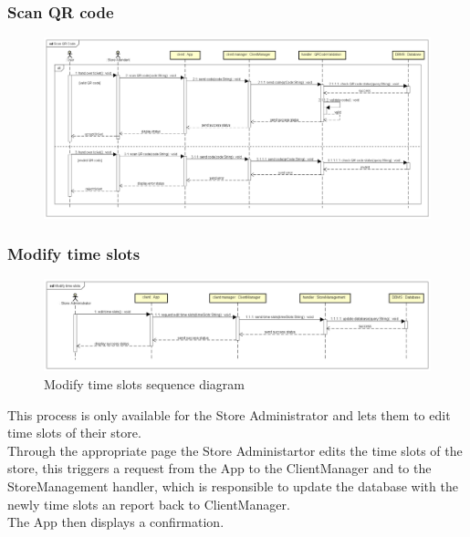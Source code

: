 \documentclass[table, 12pt]{article}
\begin{document}
\subsubsection{Scan QR code}
\begin{figure}[H]
    \begin{center}
        \includegraphics[width=\textwidth]{assets/Sequence-Diagram/scan-QR-code.png}
    \end{center}
\end{figure}



\subsubsection{Modify time slots}
\begin{figure}[H]
    \begin{center}
        \includegraphics[width=\textwidth]{assets/Sequence-Diagram/edit-time-slots.png}
        \caption{Modify time slots sequence diagram}
    \end{center}
\end{figure}
This process is only available for the Store Administrator and lets them to edit time slots of their store.\\
Through the appropriate page the Store Administartor edits the time slots of the store, this triggers a request from the App to the ClientManager and to the StoreManagement handler, which is responsible to update the database with the newly time slots an report back to ClientManager.\\
The App then displays a confirmation.
\end{document}
